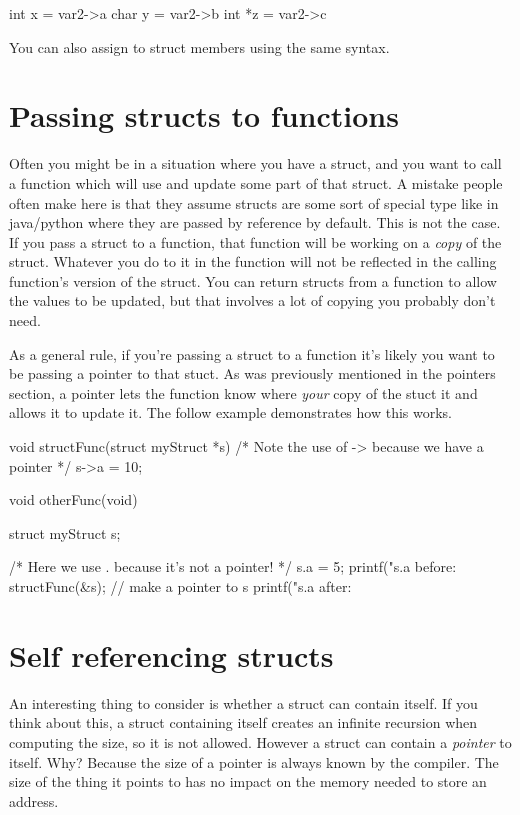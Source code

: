 \begin{codeblock}
int x = var2->a
char y = var2->b
int *z = var2->c
\end{codeblock}

You can also assign to struct members using the same syntax.

\section{Passing structs to functions}

Often you might be in a situation where you have a struct, and you want to call a function which will use and update some part of that struct.
A mistake people often make here is that they assume structs are some sort of special type like in java/python where they are passed by reference by default.
This is not the case.
If you pass a struct to a function, that function will be working on a \emph{copy} of the struct.
Whatever you do to it in the function will not be reflected in the calling function's version of the struct.
You can return structs from a function to allow the values to be updated, but that involves a lot of copying you probably don't need.

As a general rule, if you're passing a struct to a function it's likely you want to be passing a pointer to that stuct.
As was previously mentioned in the pointers section, a pointer lets the function know where \emph{your} copy of the stuct it and allows it to update it.
The follow example demonstrates how this works.

\begin{codeblock}
void
structFunc(struct myStruct *s)
{
    /* Note the use of -> because we have a pointer */
    s->a = 10;
}

void
otherFunc(void)
{
    struct myStruct s;

    /* Here we use . because it's not a pointer! */
    s.a = 5;
    printf("s.a before: %
    structFunc(&s); // make a pointer to s
    printf("s.a after: %
}
\end{codeblock}

\section{Self referencing structs}

An interesting thing to consider is whether a struct can contain itself.
If you think about this, a struct containing itself creates an infinite recursion when computing the size, so it is not allowed.
However a struct can contain a \emph{pointer} to itself.
Why?
Because the size of a pointer is always known by the compiler.
The size of the thing it points to has no impact on the memory needed to store an address.

